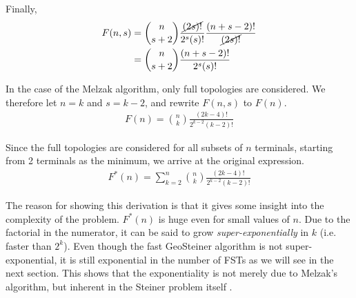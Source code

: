 \documentclass{l4proj}
\begin{document}
Finally,
\begin{equation*}
    \begin{aligned}
        F(n, s) & = \binom{n}{s+2}\frac{\cancel{(2s)!}}{2^s(s)!}\frac{(n + s - 2)!}{\cancel{(2s)!}} \\
                & = \binom{n}{s+2}\frac{(n + s - 2)!}{2^s(s)!}
    \end{aligned}
\end{equation*}

In the case of the Melzak algorithm, only full topologies are considered. We therefore let $n = k$ and $s = k - 2$, and rewrite $F(n, s)$ to $F(n)$.
\begin{equation*}
    \begin{aligned}
        F(n) = \binom{n}{k}\frac{(2k - 4)!}{2^{k-2}(k-2)!}
    \end{aligned}
\end{equation*}

Since the full topologies are considered for all subsets of $n$ terminals, starting from 2 terminals as the minimum, we arrive at the original expression.
\begin{equation*}
    \begin{aligned}
        F^*(n) = \sum_{k=2}^{n} \binom{n}{k}\frac{(2k - 4)!}{2^{k-2}(k-2)!}
    \end{aligned}
\end{equation*}

The reason for showing this derivation is that it gives some insight into the complexity of the problem.
$F^*(n)$ is huge even for small values of $n$. Due to the factorial in the numerator, it can be said to grow \textit{super-exponentially} in $k$ (i.e. faster than $2^k$). Even though the fast GeoSteiner algorithm is not super-exponential, it is still exponential in the number of FSTs as we will see in the next section. This shows that the exponentiality is not merely due to Melzak's algorithm, but inherent in the Steiner problem itself \cite{Brazil2015}.
\end{document}
